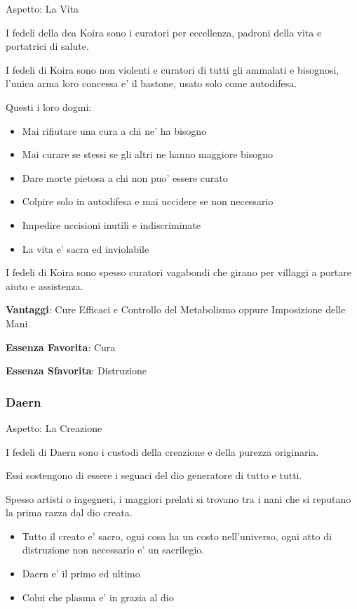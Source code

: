 \documentclass[a4paper,11pt,twoside,openany]{book}
\begin{document}
Aspetto: La Vita
\bigskip


I fedeli della dea Koira sono i curatori per eccellenza, padroni della vita e portatrici di salute.

I fedeli di Koira sono non violenti e curatori di tutti gli ammalati e bisognosi, l'unica arma loro concessa e' il bastone, usato solo come autodifesa.

Questi i loro dogmi:

\begin{itemize}
	\item Mai rifiutare una cura a chi ne' ha bisogno
	\item Mai curare se stessi se gli altri ne hanno maggiore bisogno
	\item Dare morte pietosa a chi non puo' essere curato
	\item Colpire solo in autodifesa e mai uccidere se non necessario
	\item Impedire uccisioni inutili e indiscriminate
	\item La vita e' sacra ed inviolabile
\end{itemize}


I fedeli di Koira sono spesso curatori vagabondi che girano per villaggi a portare aiuto e assistenza.


\textbf{Vantaggi}: Cure Efficaci e Controllo del Metabolismo oppure Imposizione delle Mani 

\textbf{Essenza Favorita}: Cura

\textbf{Essenza Sfavorita}: Distruzione

\bigskip

\subsubsection{Daern}

Aspetto: La Creazione
\bigskip


I fedeli di Daern sono i custodi della creazione e della purezza originaria.

Essi sostengono di essere i seguaci del dio generatore di tutto e tutti.

Spesso artisti o ingegneri, i maggiori prelati si trovano tra i nani che si reputano la prima razza dal dio creata.

\begin{itemize}
	\item Tutto il creato e' sacro, ogni cosa ha un costo nell'universo, ogni atto di distruzione non necessario e' un sacrilegio.
	\item Daern e' il primo ed ultimo
	\item Colui che plasma e' in grazia al dio
\end{itemize}
\end{document}
